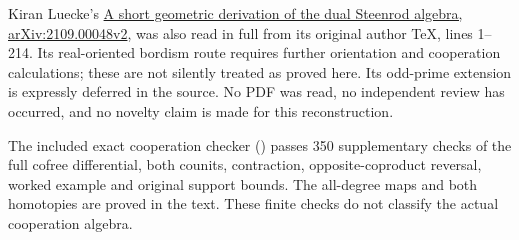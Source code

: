 Kiran Luecke's \href{https://arxiv.org/abs/2109.00048v2}{A short geometric derivation of the dual Steenrod algebra, arXiv:2109.00048v2}, was also read in full from its original author TeX, lines 1--214. Its real-oriented bordism route requires further orientation and cooperation calculations; these are not silently treated as proved here. Its odd-prime extension is expressly deferred in the source. No PDF was read, no independent review has occurred, and no novelty claim is made for this reconstruction.

The included exact cooperation checker () passes 350 supplementary checks of the full cofree differential, both counits, contraction, opposite-coproduct reversal, worked example and original support bounds. The all-degree maps and both homotopies are proved in the text. These finite checks do not classify the actual cooperation algebra.

